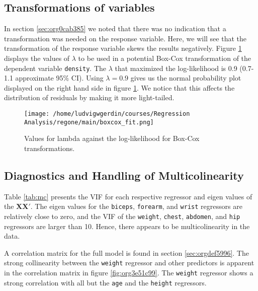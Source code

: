 \documentclass[11pt]{article}
\begin{document}


\subsection{Transformations of variables}
\label{sec:orgddd06f4}

In section \ref{sec:org0cab385} we noted that there was no indication that a transformation was needed on the 
response variable. Here, we will see that the transformation of the response variable skews the results negatively.
Figure \ref{fig:org96407b0} displays the values of \(\lambda\) to be used in a potential Box-Cox transformation of 
the dependent variable \texttt{density}. The \(\lambda\) that maximized the log-likelihood is 0.9 
(0.7-1.1 approximate 95\% CI). Using \(\lambda = 0.9\) gives us the normal probability plot displayed on the 
right hand side in figure \ref{fig:org96407b0}. We notice that this affects the distribution of residuals by
making it more light-tailed. 

\begin{figure}[h]
\centering
\texttt{[image: /home/ludvigwgerdin/courses/Regression Analysis/regone/main/boxcox\_fit.png]}
\caption{\label{fig:org96407b0}
Values for lambda against the log-likelihood for Box-Cox transformations.}
\end{figure}

\subsection{Diagnostics and Handling of Multicolinearity}
\label{sec:orgba0afc1}

Table \ref{tab:mc} presents the VIF for each respective regressor and eigen values of the
\(\textbf{X}\textbf{X}'\). The eigen values for the 
\texttt{biceps}, \texttt{forearm}, and \texttt{wrist} regressors are relatively close to zero, and the
VIF of the \texttt{weight}, \texttt{chest}, \texttt{abdomen}, and \texttt{hip} regressors are larger than 10.
Hence, there appears to be multicolinearity in the data.

A correlation matrix for the full model is found in section \ref{sec:orgdef5996}. The strong collinearity
between the \texttt{weight} regressor and other predictors is apparent in the correlation matrix in figure
\ref{fig:org3e51c99}. The \texttt{weight} regressor shows a strong correlation with all but the \texttt{age} and
the \texttt{height} regressors.

 
\end{document}
